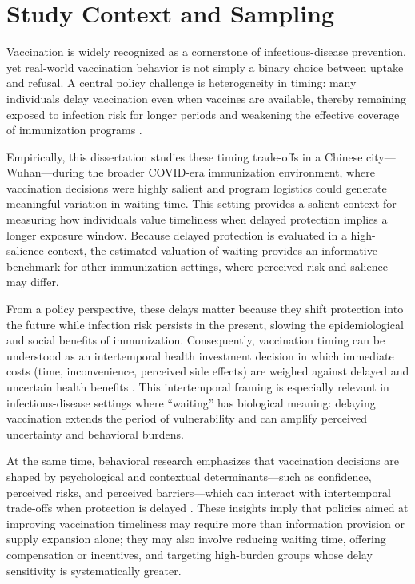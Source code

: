 \section{Study Context and Sampling}

Vaccination is widely recognized as a cornerstone of infectious-disease prevention, yet real-world vaccination behavior is not simply a binary choice between uptake and refusal. A central policy challenge is heterogeneity in timing: many individuals delay vaccination even when vaccines are available, thereby remaining exposed to infection risk for longer periods and weakening the effective coverage of immunization programs \citep{Halilova2022, Halilova2023}.

Empirically, this dissertation studies these timing trade-offs in a Chinese city---Wuhan---during the broader COVID-era immunization environment, where vaccination decisions were highly salient and program logistics could generate meaningful variation in waiting time. This setting provides a salient context for measuring how individuals value timeliness when delayed protection implies a longer exposure window. Because delayed protection is evaluated in a high-salience context, the estimated valuation of waiting provides an informative benchmark for other immunization settings, where perceived risk and salience may differ.

From a policy perspective, these delays matter because they shift protection into the future while infection risk persists in the present, slowing the epidemiological and social benefits of immunization. Consequently, vaccination timing can be understood as an intertemporal health investment decision in which immediate costs (time, inconvenience, perceived side effects) are weighed against delayed and uncertain health benefits \citep{Grossman1972, Meissner2025, Strickland2022}. This intertemporal framing is especially relevant in infectious-disease settings where ``waiting'' has biological meaning: delaying vaccination extends the period of vulnerability and can amplify perceived uncertainty and behavioral burdens.

At the same time, behavioral research emphasizes that vaccination decisions are shaped by psychological and contextual determinants---such as confidence, perceived risks, and perceived barriers---which can interact with intertemporal trade-offs when protection is delayed \citep{Halilova2024, Grytten2024}. These insights imply that policies aimed at improving vaccination timeliness may require more than information provision or supply expansion alone; they may also involve reducing waiting time, offering compensation or incentives, and targeting high-burden groups whose delay sensitivity is systematically greater.

